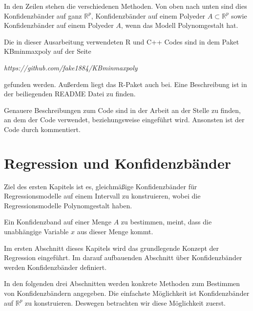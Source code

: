 \documentclass[12pt,a4paper]{article}
\theoremstyle{definition}
\theoremstyle{definition}
\theoremstyle{definition}
\theoremstyle{definition}
\begin{document}
In den Zeilen stehen die verschiedenen Methoden. Von oben nach unten sind dies Konfidenzbänder auf ganz $\mathbb{R}^p$, Konfidenzbänder auf einem Polyeder $A \subset \mathbb{R}^{p}$ sowie Konfidenzbänder auf einem Polyeder $A$, wenn das Modell Polynomgestalt hat. 

Die in dieser Ausarbeitung verwendeten R und C++ Codes sind in dem Paket KBminmaxpoly auf der Seite 

\begin{center}
\textit{https://github.com/fake1884/KBminmaxpoly} 
\end{center}

gefunden werden. Außerdem liegt das R-Paket auch bei. Eine Beschreibung ist in der beiliegenden README Datei zu finden.

Genauere Beschreibungen zum Code sind in der Arbeit an der Stelle zu finden, an dem der Code verwendet, beziehungsweise eingeführt wird. Ansonsten ist der Code durch kommentiert.






\newpage
\section{Regression und Konfidenzbänder}
\label{Regression und Konfidenzbaender}
Ziel des ersten Kapitels ist es, gleichmäßige Konfidenzbänder für Regressionsmodelle auf einem Intervall zu konstruieren, wobei die Regressionsmodelle Polynomgestalt haben. 

Ein Konfidenzband auf einer Menge $A$ zu bestimmen, meint, dass die unabhängige Variable $x$ aus dieser Menge kommt.

Im ersten Abschnitt dieses Kapitels wird das grundlegende Konzept der Regression eingeführt. Im darauf aufbauenden Abschnitt über Konfidenzbänder werden Konfidenzbänder definiert. 

In den folgenden drei Abschnitten werden konkrete Methoden zum Bestimmen von Konfidenzbändern angegeben. 
Die einfachste Möglichkeit ist Konfidenzbänder auf $\mathbb{R}^p$ zu konstruieren. Deswegen betrachten wir diese Möglichkeit zuerst.
\end{document}
